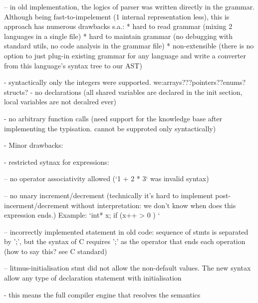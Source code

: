     -- in old implementation, the logics of parser was written directly in the grammar.
    Although being fast-to-impelement (1 internal representation less), this is approach has numerous drawbacks s.a.:
    * hard to read grammar (mixing 2 languages in a single file)
    * hard to maintain grammar (no debugging with standard utils, no code analysis in the grammar file)
    * non-extensible (there is no option to just plug-in existing grammar for any language and write a converter from this language's syntax tree to our AST)


    - syntactically only the integers were supported. we:arrays???pointers??enums?structs?
    - no declarations (all shared variables are declared in the init section, local variables are not decalred ever)

    - no arbitrary function calls (need support for the knowledge base after implementing the typisation. cannot be supproted only syntactically)


- Minor drawbacks:

    - restricted sytnax for expressions:

    -- no operator associativity allowed (`1 + 2 * 3` was invalid syntax)

    -- no unary increment/decrement (technically it's hard to implement post-incerment/decrement without interpretation: we don't know when does this expression ends.)
    Example:
    `int* x;
    if (x++ > 0 ) { }`

    -- incorrectly implemented statement in old code: sequence of stmts is separated by ';', but the syntax of C requires ';' as the operator that ends each operation (how to say this? see C standard)

    -- litmus-initialisation  stmt did not allow the non-default values. The new syntax allow any type of declaration statement with initialisation

- this means the full compiler engine that resolves the semantics


